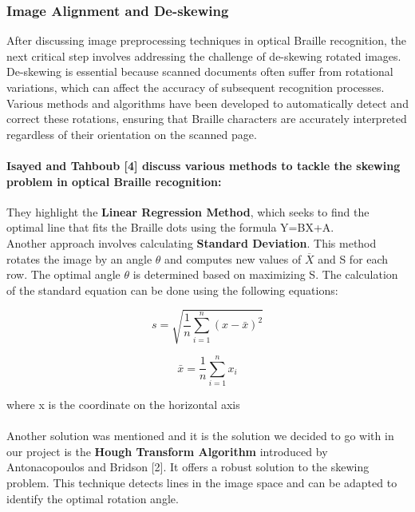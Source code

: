 \subsubsection{Image Alignment and De-skewing}

After discussing image preprocessing techniques in optical Braille recognition, the next critical step involves addressing the challenge of de-skewing rotated images. De-skewing is essential because scanned documents often suffer from rotational variations, which can affect the accuracy of subsequent recognition processes. Various methods and algorithms have been developed to automatically detect and correct these rotations, ensuring that Braille characters are accurately interpreted regardless of their orientation on the scanned page. 

\paragraph{
Isayed and Tahboub [4] discuss various methods to tackle the skewing problem in optical Braille recognition:\\}

They highlight the \textbf{Linear Regression Method}, which seeks to find the optimal line that fits the Braille dots using the formula Y=BX+A.\\

Another approach involves calculating \textbf{Standard Deviation}. This method rotates the image by an angle $\theta$ and computes new values of  $\overline{X}$ and S for each row. The optimal angle $\theta$ is determined based on maximizing S.  The calculation of the standard equation can be done using the following equations:

\begin{equation}
s = \sqrt{\frac{1}{n} \sum_{i=1}^{n} (x - \bar{x})^2}
\end{equation}

\begin{equation}
\bar{x} = \frac{1}{n} \sum_{i=1}^{n} x_i
\end{equation}

where x is the coordinate on the horizontal axis\\
\\Another solution was mentioned and it is the solution we decided to go with in our project is the \textbf{Hough Transform Algorithm} introduced by Antonacopoulos and Bridson [2]. It offers a robust solution to the skewing problem. This technique detects lines in the image space and can be adapted to identify the optimal rotation angle. 


